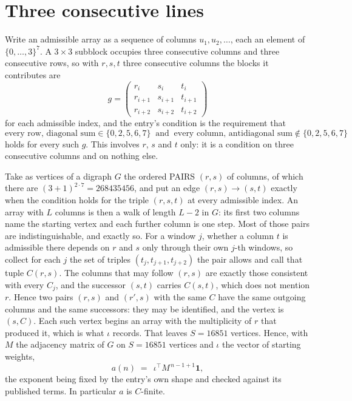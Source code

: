 \documentclass[11pt,a4paper]{article}
\theoremstyle{plain}
\theoremstyle{definition}
\begin{document}
\section{Three consecutive lines}

Write an admissible array as a sequence of columns $u_1,u_2,\dots$, each an element of
$\{0,\dots,3\}^{7}$. A $3\times3$ subblock occupies three consecutive columns and
three consecutive rows, so with $r,s,t$ three consecutive columns the blocks it
contributes are
\[
g=\begin{pmatrix}r_i&s_i&t_i\\ r_{i+1}&s_{i+1}&t_{i+1}\\ r_{i+2}&s_{i+2}&t_{i+2}\end{pmatrix}
\]
for each admissible index, and the entry's condition is the requirement that
\[
\text{every row, diagonal sum} \in \{0,2,5,6,7\}\ \text{ and }\ \text{every column, antidiagonal sum} \notin \{0,2,5,6,7\}
\]
holds for every such $g$. This involves $r$, $s$ and $t$ only: it is a condition on
three consecutive columns and on nothing else.

Take as vertices of a digraph $G$ the ordered PAIRS $(r,s)$ of columns, of which there are
$(3+1)^{2\cdot7}=268435456$, and put an edge $(r,s)\to(s,t)$ exactly when the condition
holds for the triple $(r,s,t)$ at every admissible index. An array with $L$ columns is then a
walk of length $L-2$ in $G$: its first two columns name the starting vertex and each further
column is one step. Most of those pairs are indistinguishable, and exactly so. For a window $j$, whether a column $t$ is admissible there depends on $r$ and $s$ only through their own $j$-th windows, so collect for each $j$ the set of triples $(t_j,t_{j+1},t_{j+2})$ the pair allows and call that tuple $C(r,s)$. The columns that may follow $(r,s)$ are exactly those consistent with every $C_j$, and the successor $(s,t)$ carries $C(s,t)$, which does not mention $r$. Hence two pairs $(r,s)$ and $(r',s)$ with the same $C$ have the same outgoing columns and the same successors: they may be identified, and the vertex is $(s,C)$. Each such vertex begins an array with the multiplicity of $r$ that produced it, which is what $\iota$ records. That leaves $S=16851$ vertices. Hence, with $M$ the adjacency matrix of $G$ on $S=16851$ vertices and
$\iota$ the vector of starting weights,
\[
a(n)\;=\;\,\iota^{\!\top}M^{\,n-1+1}\mathbf{1},
\]
the exponent being fixed by the entry's own shape and checked against its published terms.
In particular $a$ is $C$-finite.
\end{document}
